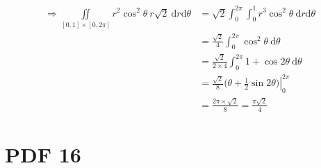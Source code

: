 \documentclass[12pt, fleqn]{book}
\begin{document}
 				\begin{equation*}
 					\begin{split}
	 					\Rightarrow \iint\limits_{[0, 1] \times [0, 2\pi]}
 						r^2\cos^2\theta \ r\sqrt{2} \ \mathrm{d}r \mathrm{d}\theta
 						 & = \sqrt{2} \int_{0}^{2\pi} \int_{0}^{1} r^3\cos^2\theta \ \mathrm{d}r \mathrm{d}\theta \\
 						 & = \frac{\sqrt{2}}{4} \int_{0}^{2\pi} \cos^2\theta \ \mathrm{d}\theta \\
 						 & = \frac{\sqrt{2}}{2 \times 4} \int_{0}^{2\pi} 1 + \cos2\theta \ \mathrm{d}\theta \\
 						 & = \frac{\sqrt{2}}{8} \left.\big(\theta + \frac{1}{2}\sin2\theta\big)\right|_0^{2\pi} \\
 						 & = \frac{2\pi \times \sqrt{2}}{8} = \frac{\pi\sqrt{2}}{4}
 					\end{split}
 				\end{equation*}
\chapter{PDF 16}\label{pdf16}
\end{document}
